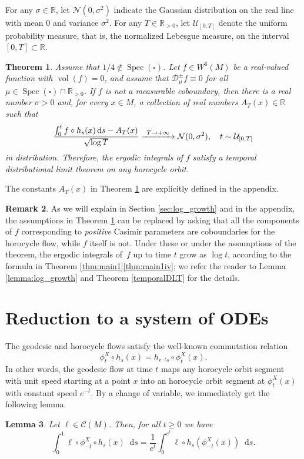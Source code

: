 \documentclass[11pt]{article}
\newcommand\To[1]{\mathchoice{\xrightarrow{\kern4pt#1\kern3pt}}{\stackrel{#1}{\longrightarrow}}{}{}}
\newcommand \R{\mathbb{R}}
\newcommand {\cN}{\mathcal{N}}
\newcommand*{\diff}{\mathop{}\!\mathrm{d}}
\newcommand{\Dpm}[1]{\mathcal{D}_\mu^{\pm} #1}
\DeclareMathOperator{\vol}{vol}
\DeclareMathOperator{\Spec}{Spec}
\newtheorem{theorem}{Theorem}
\newtheorem {lemma}[theorem]{Lemma}
\theoremstyle{definition}
\newtheorem{remark}[theorem]{Remark}
\begin{document}
For any $\sigma\in \R$, let $\cN(0,\sigma^{2})$ indicate the Gaussian distribution on the real line with mean $0$ and variance $\sigma^{2}$. For any $T\in \R_{>0}$, let $\mathcal{U}_{[0,T]}$ denote the uniform probability measure, that is, the normalized Lebesgue measure, on the interval $[0,T]\subset \R$.

\begin{theorem}\label{thm:main_DS}
Assume that $1/4 \notin \Spec(\square)$. Let $f \in W^6(M)$ be a real-valued function with $\vol(f)=0$, and assume that $\Dpm{f} \equiv 0$ for all $\mu \in \Spec(\square) \cap \R_{>0}$.
If $f$ is not a measurable coboundary, then there is a real number $\sigma>0$ and, for every $x \in M$, a collection of real numbers $A_T(x) \in \R$ such that
\[
\frac{\int_0^{t}f\circ h_s(x) \diff s - A_T(x)}{\sqrt{\log{T}}}\To{T\to+\infty}\cN(0,\sigma^{2}), \quad t\sim \mathcal{U}_{[0,T]}
\]
in distribution. Therefore, the ergodic integrals of $f$ satisfy a temporal distributional limit theorem on any horocycle orbit.
\end{theorem}

The constants $A_T(x)$ in Theorem \ref{thm:main_DS} are explicitly defined in the appendix.

\begin{remark}
As we will explain in Section \ref{sec:log_growth} and in the appendix, the assumptions in Theorem \ref{thm:main_DS} can be replaced by asking that all the components of $f$ corresponding to \emph{positive} Casimir parameters are coboundaries for the horocycle flow, while $f$ itself is not. Under these or under the assumptions of the theorem, the ergodic integrals of~$f$ up to time $t$ grow as $\log t$, according to the formula in Theorem \ref{thm:main1}\eqref{thm:main1iv}; we refer the reader to Lemma \ref{lemma:log_growth} and Theorem \ref{temporalDLT} for the details.
\end{remark}

\section{Reduction to a system of ODEs}\label{sec:reduction}

The geodesic and horocycle flows satisfy the well-known commutation relation
\[
\phi^X_t \circ h_s (x) = h_{e^{-t}s} \circ \phi^X_t(x).
\]
In other words, the geodesic flow at time $t$ maps any horocycle orbit segment with unit speed starting at a point $x$ into an horocycle orbit segment at $\phi^X_t(x)$ with constant speed $e^{-t}$.
By a change of variable, we immediately get the following lemma.
\begin{lemma}\label{lemma:c_o_v}
Let $\ell \in \mathscr{C}(M)$. Then, for all $t \geq 0$ we have
\[
\int_0^1 \ell \circ \phi^X_{-t}\circ h_s(x) \diff s = \frac{1}{e^t}\int_0^{e^t} \ell \circ h_s (\phi^X_{-t}(x)) \diff s.
\]
\end{lemma}
\end{document}
